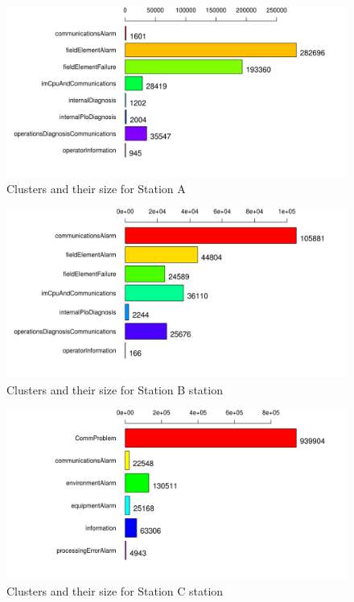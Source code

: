 \begin{figure}[hbtp]
\includegraphics[width=\textwidth]{img/clusters_alb.png}
\caption{Clusters and their size for Station A} \label{fig:clusters_alb}
\end{figure}

\begin{figure}[hbtp]
\includegraphics[width=\textwidth]{img/clusters_ant.png}
\caption{Clusters and their size for Station B station} \label{fig:clusters_ant}
\end{figure}

\begin{figure}[hbtp]
\includegraphics[width=\textwidth]{img/clusters_seg.png}
\caption{Clusters and their size for Station C station} \label{fig:clusters_seg}
\end{figure}

